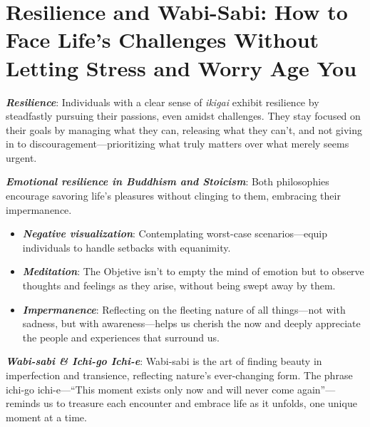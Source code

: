 \section*{Resilience and Wabi-Sabi: How to Face Life’s Challenges Without Letting Stress and Worry Age You}

\textbf{\textit{Resilience}}: Individuals with a clear sense of \textit{ikigai} exhibit resilience by steadfastly pursuing their passions, even amidst challenges. They stay focused on their goals by managing what they can, releasing what they can’t, and not giving in to discouragement—prioritizing what truly matters over what merely seems urgent.

\textbf{\textit{Emotional resilience in Buddhism and Stoicism}}: Both philosophies encourage savoring life’s pleasures without clinging to them, embracing their impermanence. 
\begin{itemize}
    \item \textbf{\textit{Negative visualization}}: Contemplating worst-case scenarios—equip individuals to handle setbacks with equanimity.
    \item \textbf{\textit{Meditation}}: The Objetive isn’t to empty the mind of emotion but to observe thoughts and feelings as they arise, without being swept away by them.
    \item \textbf{\textit{Impermanence}}: Reflecting on the fleeting nature of all things—not with sadness, but with awareness—helps us cherish the now and deeply appreciate the people and experiences that surround us.
\end{itemize}

\textbf{\textit{Wabi-sabi \& Ichi-go Ichi-e}}: Wabi-sabi is the art of finding beauty in imperfection and transience, reflecting nature’s ever-changing form. The phrase ichi-go ichi-e—“This moment exists only now and will never come again”—reminds us to treasure each encounter and embrace life as it unfolds, one unique moment at a time. 

